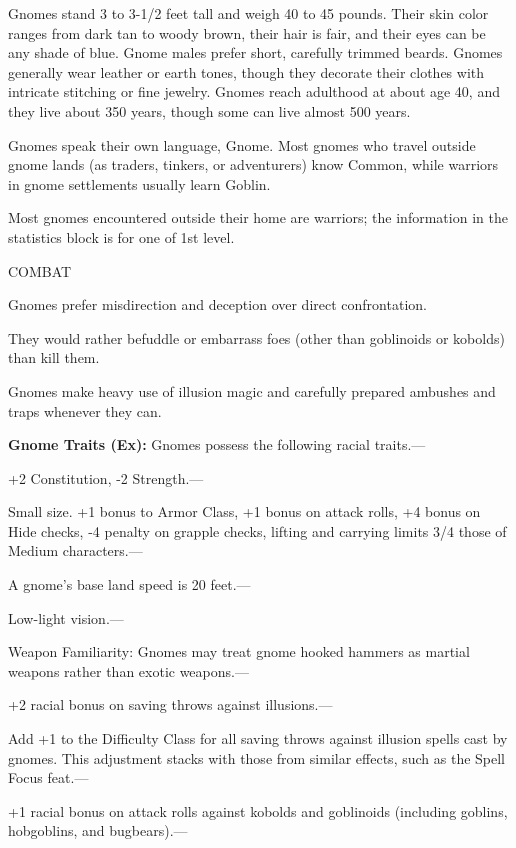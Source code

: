 \documentclass{article}
\begin{document}
Gnomes stand 3 to 3-1/2 feet tall and weigh 40 to 45 pounds. Their skin color ranges 
from dark tan to woody brown, their hair is fair, and their eyes can be any shade 
of blue. Gnome males prefer short, carefully trimmed beards. Gnomes generally wear 
leather or earth tones, though they decorate their clothes with intricate stitching 
or fine jewelry. Gnomes reach adulthood at about age 40, and they live about 350 
years, though some can live almost 500 years.

Gnomes speak their own language, Gnome. Most gnomes who travel outside gnome lands 
(as traders, tinkers, or adventurers) know Common, while warriors in gnome settlements 
usually learn Goblin.

Most gnomes encountered outside their home are warriors; the information in the 
statistics block is for one of 1st level.

COMBAT

Gnomes prefer misdirection and deception over direct confrontation.

They would rather befuddle or embarrass foes (other than goblinoids or kobolds) 
than kill them.

Gnomes make heavy use of illusion magic and carefully prepared ambushes and traps 
whenever they can.

\textbf{Gnome Traits (Ex):} Gnomes possess the following racial traits.--- 

\parindent=3pt
+2 Constitution, -2 Strength.---

\parindent=0pt
Small size. +1 bonus to Armor Class, +1 bonus on attack rolls, +4 bonus on Hide 
checks, -4 penalty on grapple checks, lifting and carrying limits 3/4 those of 
Medium characters.---

A gnome's base land speed is 20 feet.---

Low-light vision.---

Weapon Familiarity: Gnomes may treat gnome hooked hammers as martial weapons rather 
than exotic weapons.--- 

\parindent=3pt
+2 racial bonus on saving throws against illusions.---

\parindent=0pt
Add +1 to the Difficulty Class for all saving throws against illusion spells cast 
by gnomes. This adjustment stacks with those from similar effects, such as the 
Spell Focus feat.--- 

\parindent=3pt
+1 racial bonus on attack rolls against kobolds and goblinoids (including goblins, 
hobgoblins, and bugbears).--- 
\end{document}
